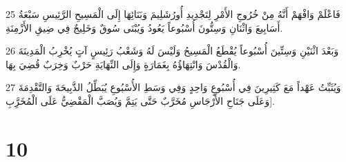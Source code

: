 \par 25 فَاعْلَمْ وَافْهَمْ أَنَّهُ مِنْ خُرُوجِ الأَمْرِ لِتَجْدِيدِ أُورُشَلِيمَ وَبَنَائِهَا إِلَى الْمَسِيحِ الرَّئِيسِ سَبْعَةُ أَسَابِيعَ وَاثْنَانِ وَسِتُّونَ أُسْبُوعاً يَعُودُ وَيُبْنَى سُوقٌ وَخَلِيجٌ فِي ضِيقِ الأَزْمِنَةِ.
\par 26 وَبَعْدَ اثْنَيْنِ وَسِتِّينَ أُسْبُوعاً يُقْطَعُ الْمَسِيحُ وَلَيْسَ لَهُ وَشَعْبُ رَئِيسٍ آتٍ يُخْرِبُ الْمَدِينَةَ وَالْقُدْسَ وَانْتِهَاؤُهُ بِغَمَارَةٍ وَإِلَى النِّهَايَةِ حَرْبٌ وَخِرَبٌ قُضِيَ بِهَا.
\par 27 وَيُثَبِّتُ عَهْداً مَعَ كَثِيرِينَ فِي أُسْبُوعٍ وَاحِدٍ وَفِي وَسَطِ الأُسْبُوعِ يُبَطِّلُ الذَّبِيحَةَ وَالتَّقْدِمَةَ وَعَلَى جَنَاحِ الأَرْجَاسِ مُخَرَّبٌ حَتَّى يَتِمَّ وَيُصَبَّ الْمَقْضِيُّ عَلَى الْمُخَرَِّبِ].

\chapter{10}

